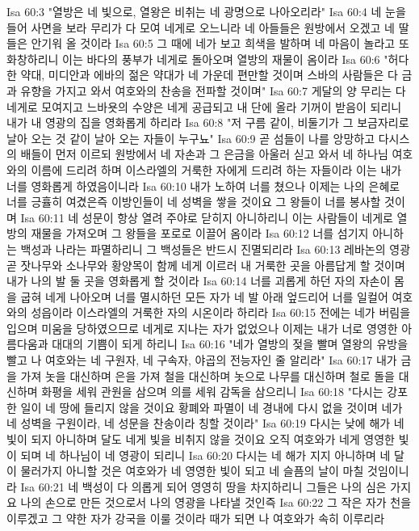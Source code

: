 Isa 60:3  "열방은 네 빛으로, 열왕은 비취는 네 광명으로 나아오리라"
Isa 60:4  네 눈을 들어 사면을 보라 무리가 다 모여 네게로 오느니라 네 아들들은 원방에서 오겠고 네 딸들은 안기워 올 것이라
Isa 60:5  그 때에 네가 보고 희색을 발하며 네 마음이 놀라고 또 화창하리니 이는 바다의 풍부가 네게로 돌아오며 열방의 재물이 옴이라
Isa 60:6  "허다한 약대, 미디안과 에바의 젊은 약대가 네 가운데 편만할 것이며 스바의 사람들은 다 금과 유향을 가지고 와서 여호와의 찬송을 전파할 것이며"
Isa 60:7  게달의 양 무리는 다 네게로 모여지고 느바욧의 수양은 네게 공급되고 내 단에 올라 기꺼이 받음이 되리니 내가 내 영광의 집을 영화롭게 하리라
Isa 60:8  "저 구름 같이, 비둘기가 그 보금자리로 날아 오는 것 같이 날아 오는 자들이 누구뇨"
Isa 60:9  곧 섬들이 나를 앙망하고 다시스의 배들이 먼저 이르되 원방에서 네 자손과 그 은금을 아울러 싣고 와서 네 하나님 여호와의 이름에 드리려 하며 이스라엘의 거룩한 자에게 드리려 하는 자들이라 이는 내가 너를 영화롭게 하였음이니라
Isa 60:10  내가 노하여 너를 쳤으나 이제는 나의 은혜로 너를 긍휼히 여겼은즉 이방인들이 네 성벽을 쌓을 것이요 그 왕들이 너를 봉사할 것이며
Isa 60:11  네 성문이 항상 열려 주야로 닫히지 아니하리니 이는 사람들이 네게로 열방의 재물을 가져오며 그 왕들을 포로로 이끌어 옴이라
Isa 60:12  너를 섬기지 아니하는 백성과 나라는 파멸하리니 그 백성들은 반드시 진멸되리라
Isa 60:13  레바논의 영광 곧 잣나무와 소나무와 황양목이 함께 네게 이르러 내 거룩한 곳을 아름답게 할 것이며 내가 나의 발 둘 곳을 영화롭게 할 것이라
Isa 60:14  너를 괴롭게 하던 자의 자손이 몸을 굽혀 네게 나아오며 너를 멸시하던 모든 자가 네 발 아래 엎드리어 너를 일컬어 여호와의 성읍이라 이스라엘의 거룩한 자의 시온이라 하리라
Isa 60:15  전에는 네가 버림을 입으며 미움을 당하였으므로 네게로 지나는 자가 없었으나 이제는 내가 너로 영영한 아름다움과 대대의 기쁨이 되게 하리니
Isa 60:16  "네가 열방의 젖을 빨며 열왕의 유방을 빨고 나 여호와는 네 구원자, 네 구속자, 야곱의 전능자인 줄 알리라"
Isa 60:17  내가 금을 가져 놋을 대신하며 은을 가져 철을 대신하며 놋으로 나무를 대신하며 철로 돌을 대신하며 화평을 세워 관원을 삼으며 의를 세워 감독을 삼으리니
Isa 60:18  "다시는 강포한 일이 네 땅에 들리지 않을 것이요 황폐와 파멸이 네 경내에 다시 없을 것이며 네가 네 성벽을 구원이라, 네 성문을 찬송이라 칭할 것이라"
Isa 60:19  다시는 낮에 해가 네 빛이 되지 아니하며 달도 네게 빛을 비취지 않을 것이요 오직 여호와가 네게 영영한 빛이 되며 네 하나님이 네 영광이 되리니
Isa 60:20  다시는 네 해가 지지 아니하며 네 달이 물러가지 아니할 것은 여호와가 네 영영한 빛이 되고 네 슬픔의 날이 마칠 것임이니라
Isa 60:21  네 백성이 다 의롭게 되어 영영히 땅을 차지하리니 그들은 나의 심은 가지요 나의 손으로 만든 것으로서 나의 영광을 나타낼 것인즉
Isa 60:22  그 작은 자가 천을 이루겠고 그 약한 자가 강국을 이룰 것이라 때가 되면 나 여호와가 속히 이루리라
